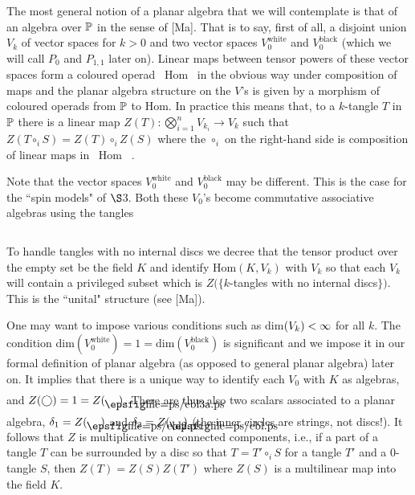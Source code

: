 \[
	
\]

The most general notion of a planar algebra that
we will contemplate is that of an algebra over
$\Bbb P$ in the sense of [Ma].  That is to say, first
of all, a disjoint union $V_k$ of vector spaces
for $k>0$ and two vector spaces
$V_0^{\text{white}}$ and $V_0^{\text{black}}$
(which we will call $P_0$ and $P_{1,1}$ later on).
Linear maps between tensor powers of these vector
spaces form a coloured operad \ Hom \ in the
obvious way under composition of maps and the
planar algebra structure  on the $V$'s is given by
a morphism of coloured operads from $\Bbb P$ to Hom. 
In
practice this means that, to a $k$-tangle $T$ in
$\Bbb P$ there is a linear map
$Z(T):\bigotimes^n_{i=1}V_{k_i}\to V_k$ such that
$Z(T\circ_i S)=Z(T)\circ_i Z(S)$ where the
$\circ_i$ on the right-hand side is composition of
linear maps in \ Hom \ .

Note that the vector spaces $V_0^{\text{white}}$ and $V_0^{\text{black}}$
may be different. This is the case for the ``spin
models" of $\S$3. Both these $V_0$'s become
commutative associative algebras using the tangles

\[
	
\]

To handle tangles with no internal discs we decree
that the tensor product over the empty set be the
field $K$ and identify Hom$(K,V_k)$ with $V_k$ so
that each $V_k$ will contain a privileged subset
which is $Z(\{ k$-tangles with no internal
discs$\})$. This is the ``unital"
 structure (see [Ma]).

One may want to impose various conditions such as
dim$(V_k)<\infty$ for all $k$. The condition
dim$(V_0^{\text{white}})=1=$dim$(V_0^{\text{black}})$
is significant and we impose it in our formal
definition of planar algebra (as opposed to
general planar algebra) later on.  It implies that
there is a unique way to identify each $V_0$ with
$K$ as algebras, and $Z(\bigcirc)=1=Z(\deyea )$.
There are thus also two scalars associated to a
planar algebra, $\d_1=Z(\weye )$ and
$\d_2=Z(\beye )$ (the inner circles are strings,
not discs!). It follows that  $Z$ is
multiplicative on connected components, i.e., if a
part of a tangle $T$ can be surrounded by a disc
so that $T=T'\circ_i S$ for a tangle $T'$ and a
0-tangle $S$, then $Z(T)=Z(S)Z(T')$ where $Z(S)$
is a multilinear map into the field $K$.

